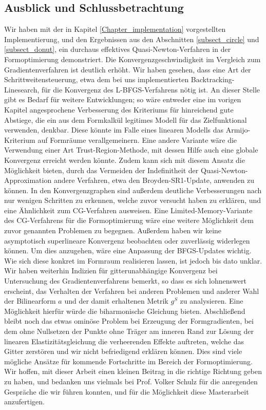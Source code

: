 \subsection{Ausblick und Schlussbetrachtung}
Wir haben mit der in Kapitel \ref{Chapter_implementation} vorgestellten Implementierung, und den Ergebnissen aus den Abschnitten \ref{subsect_circle} und \ref{subsect_donut}, ein durchaus effektives Quasi-Newton-Verfahren in der Formoptimierung demonstriert. 
Die Konvergenzgeschwindigkeit im Vergleich zum Gradientenverfahren ist deutlich erhöht. Wir haben gesehen, dass eine Art der Schrittweitensteuerung, etwa dem bei uns implementierten Backtracking-Linesearch, für die Konvergenz des L-BFGS-Verfahrens nötig ist. An dieser Stelle gibt es Bedarf für weitere Entwicklungen; so wäre entweder eine im vorigen Kapitel angesprochene Verbesserung des Kriteriums für hinreichend gute Abstiege, die ein aus dem Formkalkül legitimes Modell für das Zielfunktional verwenden, denkbar. Diese könnte im Falle eines linearen Modells das Armijo-Kriterium auf Formräume verallgemeinern. Eine andere Variante wäre die Verwendung einer Art Trust-Region-Methode, mit dessen Hilfe auch eine globale Konvergenz erreicht werden könnte. Zudem kann sich mit diesem Ansatz die Möglichkeit bieten, durch das Vermeiden der Indefinitheit der Quasi-Newton-Approximation andere Verfahren, etwa den Broyden-SR1-Update, anwenden zu können. In den Konvergenzgraphen sind außerdem deutliche Verbesserungen nach nur wenigen Schritten zu erkennen, welche zuvor versucht haben zu erklären, und eine Ähnlichkeit zum CG-Verfahren ausweisen. Eine Limited-Memory-Variante des CG-Verfahrens für die Formoptimierung wäre eine weitere Möglichkeit dem zuvor genannten Problemen zu begegnen. Außerdem haben wir keine asymptotisch superlineare Konvergenz beobachten oder zuverlässig widerlegen können. Um dies anzugehen, wäre eine Anpassung der BFGS-Updates wichtig. Wie sich diese konkret im Formraum realisieren lassen, ist jedoch bis dato unklar. Wir haben weiterhin Indizien für gitterunabhängige Konvergenz bei Untersuchung des Gradientenverfahrens bemerkt, so dass es sich lohnenswert erscheint, das Verhalten der Verfahren bei anderen Problemen und anderer Wahl der Bilinearform $a$ und der damit erhaltenen Metrik $g^S$ zu analysieren. Eine Möglichkeit hierfür würde die biharmonische Gleichung bieten. Abschließend bleibt noch das etwas ominöse Problem bei Erzeugung der Formgradienten, bei dem ohne Nullsetzen der Punkte ohne Träger am inneren Rand zur Lösung der linearen Elastizitätsgleichung die verheerenden Effekte auftreten, welche das Gitter zerstören und wir nicht befriedigend erklären können. Dies sind viele mögliche Ansätze für kommende  Fortschritte im Bereich der Formoptimierung. Wir hoffen, mit dieser Arbeit einen kleinen Beitrag in die richtige Richtung geben zu haben, und bedanken uns vielmals bei Prof. Volker Schulz für die anregenden Gespräche die wir führen konnten, und für die Möglichkeit diese Masterarbeit anzufertigen.
\newpage
\nocite{*}




